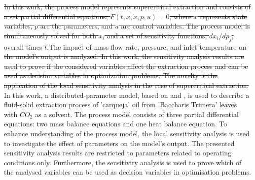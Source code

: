 \documentclass[../Article_Model_Parameters.tex]{subfiles}
\begin{document}
	\sout{In this work, the process model represents supercritical extraction and consists of a set partial differential equations, $F(t,x,\dot{x},p,u)=0$, where $x$ represents state variables, $p$ are the parameters, and $u$ are control variables. The process model is simultaneously solved for both $x_i$ and a set of sensitivity functions, $dx_i/dp_j$, overall times $t$.The impact of mass flow rate, pressure, and inlet temperature on the model's output is analyzed. In this work, the sensitivity analysis results are used to prove if the considered variables affect the extraction process and can be used as decision variables in optimization problems. The novelty is the application of the local sensitivity analysis in the case of supercritical extraction.}
	{\color{blue}In this work, a distributed-parameter model, based on \citet{Reverchon1996} and \citet{Vargas2006}, is used to describe a fluid-solid extraction process of 'carqueja' oil from 'Baccharis Trimera' leaves with $CO_2$ as a solvent. The process model consists of three partial differential equations: two mass balance equations and one heat balance equation. To enhance understanding of the process model, the local sensitivity analysis is used to investigate the effect of parameters on the model's output. The presented sensitivity analysis results are restricted to parameters related to operating conditions only. Furthermore, the sensitivity analysis is used to prove which of the analysed variables can be used as decision variables in optimisation problems.}
	
\end{document}

